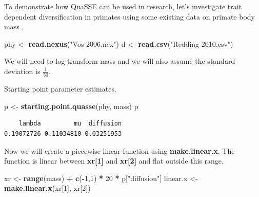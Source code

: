 \documentclass[
]{book}
\newenvironment{Shaded}{\begin{snugshade}}{\end{snugshade}}
\newcommand{\DecValTok}[1]{\textcolor[rgb]{0.00,0.00,0.81}{#1}}
\newcommand{\KeywordTok}[1]{\textcolor[rgb]{0.13,0.29,0.53}{\textbf{#1}}}
\newcommand{\NormalTok}[1]{#1}
\newcommand{\OperatorTok}[1]{\textcolor[rgb]{0.81,0.36,0.00}{\textbf{#1}}}
\newcommand{\StringTok}[1]{\textcolor[rgb]{0.31,0.60,0.02}{#1}}
\begin{document}
To demonstrate how QuaSSE can be used in research, let's investigate trait dependent diversification in primates using some existing data on primate body mass \citep{Fitzjohn10}.

\begin{Shaded}
\begin{Highlighting}[]
\NormalTok{phy \textless{}{-}}\StringTok{ }\KeywordTok{read.nexus}\NormalTok{(}\StringTok{"Vos{-}2006.nex"}\NormalTok{)}
\NormalTok{d \textless{}{-}}\StringTok{ }\KeywordTok{read.csv}\NormalTok{(}\StringTok{"Redding{-}2010.csv"}\NormalTok{)}
\end{Highlighting}
\end{Shaded}

We will need to log-transform mass and we will also assume the standard deviation is \(\frac{1}{50}\).

\begin{Shaded}
\end{Shaded}

Starting point parameter estimates.

\begin{Shaded}
\begin{Highlighting}[]
\NormalTok{p \textless{}{-}}\StringTok{ }\KeywordTok{starting.point.quasse}\NormalTok{(phy, mass)}
\NormalTok{p}
\end{Highlighting}
\end{Shaded}

\begin{verbatim}
    lambda         mu  diffusion 
0.19072726 0.11034810 0.03251953 
\end{verbatim}

Now we will create a piecewise linear function using \textbf{make.linear.x}. The function is linear between \textbf{xr{[}1{]}} and \textbf{xr{[}2{]}} and flat outside this range.

\begin{Shaded}
\begin{Highlighting}[]
\NormalTok{xr \textless{}{-}}\StringTok{ }\KeywordTok{range}\NormalTok{(mass) }\OperatorTok{+}\StringTok{ }\KeywordTok{c}\NormalTok{(}\OperatorTok{{-}}\DecValTok{1}\NormalTok{,}\DecValTok{1}\NormalTok{) }\OperatorTok{*}\StringTok{ }\DecValTok{20} \OperatorTok{*}\StringTok{ }\NormalTok{p[}\StringTok{"diffusion"}\NormalTok{]}
\NormalTok{linear.x \textless{}{-}}\StringTok{ }\KeywordTok{make.linear.x}\NormalTok{(xr[}\DecValTok{1}\NormalTok{], xr[}\DecValTok{2}\NormalTok{])}
\end{Highlighting}
\end{Shaded}
\end{document}
